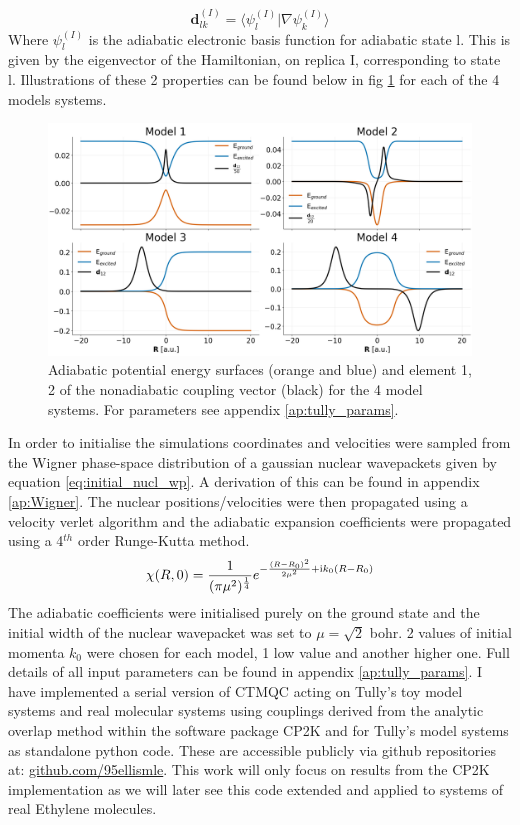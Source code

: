 \begin{equation}
  \mathbf{d}_{lk}^{(I)} = \langle \psi_{l}^{(I)} | \nabla \psi_k^{(I)} \rangle
  \label{eq:NACV_def}
\end{equation}
Where $\psi_{l}^{(I)}$ is the adiabatic electronic basis function for adiabatic state l. This is given by the eigenvector of the Hamiltonian, on replica I, corresponding to state l. Illustrations of these 2 properties can be found below in fig \ref{fig:tully_schematics} for each of the 4 models systems.
\begin{figure}[H]
  \includegraphics[width=\textwidth]{Chapter_tullyModels/model_schematics.png}
  \caption{\label{fig:tully_schematics}Adiabatic potential energy surfaces (orange and blue) and element 1, 2 of the nonadiabatic coupling vector (black) for the 4 model systems. For parameters see appendix \ref{ap:tully_params}.}
\end{figure}
\newpage
\noindent In order to initialise the simulations coordinates and velocities were sampled from the Wigner phase-space distribution of a gaussian nuclear wavepackets given by equation \eqref{eq:initial_nucl_wp}. A derivation of this can be found in appendix \ref{ap:Wigner}. The nuclear positions/velocities were then propagated using a velocity verlet algorithm and the adiabatic expansion coefficients were propagated using a 4$^{th}$ order Runge-Kutta method.
\begin{equation}
  \chi(R, 0) = \frac{1}{(\pi \mu^2)^{\frac{1}{4}}} e^{-\frac{(R - R_0)^2}{2 \mu^2} + \mathrm{i} k_0 (R - R_0) }
  \label{eq:initial_nucl_wp}
\end{equation}
The adiabatic coefficients were initialised purely on the ground state and the initial width of the nuclear wavepacket was set to $\mu = \sqrt{2}$ bohr. 2 values of initial momenta $k_0$ were chosen for each model, 1 low value and another higher one. Full details of all input parameters can be found in appendix \ref{ap:tully_params}. I have implemented a serial version of CTMQC acting on Tully's toy model systems and real molecular systems using couplings derived from the analytic overlap method \cite{gajdos_ultrafast_2014} within the software package CP2K \cite{cp2k} and for Tully's model systems as standalone python code. These are accessible publicly via github repositories at: \href{https://github.com/95ellismle}{github.com/95ellismle}. This work will only focus on results from the CP2K implementation as we will later see this code extended and applied to systems of real Ethylene molecules.

